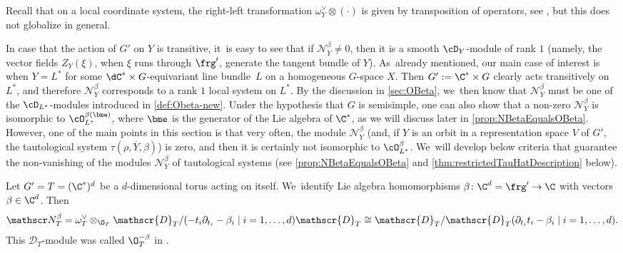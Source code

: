 Recall that on a local coordinate system, the right-left transformation $\omega_Y^\vee \otimes (\cdot)$ is given by transposition of operators, see \eg \cite[\S 1.2]{Hotta}, but this does not globalize in general.

\begin{rmk}\label{rem:LocSysRkOne}
In case that the action of $G'$ on $Y$ is transitive, it~is easy to see that if $\mathscr N_Y^\beta\neq 0$, then it is a smooth $\cD_Y$\nobreakdash-mod\-ule of rank $1$ (namely, the vector fields $Z_Y(\xi)$, when $\xi$ runs through $\frg'$, generate the tangent bundle of $Y$). As~already mentioned, our main case of interest is when $Y=L^*$ for some $\dC^*\times G$-equivariant line bundle~$L$ on a homogeneous $G$-space $X$. Then $G':=\C^*\times G$ clearly acts transitively on $L^*$, and therefore $\mathscr N_Y^\beta$ corresponds to a rank $1$ local system on $L^*$. By the discussion in \cref{sec:OBeta}, we~then know that $\mathscr N_Y^\beta$ must be one of the $\cD_{L^*}$\nobreakdash-mod\-ules introduced in \cref{def:Obeta-new}. Under the hypothesis that $G$ is semisimple, one can also show that a non-zero $\mathscr{N}_Y^\beta$ is isomorphic to
$\cO_{L^*}^{\beta(\bme)}$, where $\bme$ is the generator of the Lie algebra of $\C^*$, as we will discuss later in \cref{prop:NBetaEqualsOBeta}. However, one of the main points in this section is that very often, the module $\mathscr N_Y^\beta$ (and, if $Y$ is an orbit in a representation space $V$ of $G'$, the tautological system $\tau(\rho,\overline{Y},\beta)$) is zero, and then it is certainly not isomorphic to $\cO_{L^*}^{\beta}$. We~will develop below criteria that guarantee the non-vanishing of the modules $\mathscr N_Y^\beta$ \resp of tautological systems (see \cref{prop:NBetaEqualsOBeta} and \cref{thm:restrictedTauHatDescription} below).
\end{rmk}

\begin{exa}
Let $G' = T = (\C^*)^d$ be a $d$-dimensional torus acting on itself. We~identify Lie algebra homomorphisms $\beta \colon \C^d = \frg' \to \C$ with vectors $\beta \in \C^d$. Then
\[
\mathscr N_T^\beta = \omega_T^\vee \otimes_{\O_T} \mathscr{D}_T/(-t_i \partial_{t_i}-\beta_i \mid i = 1,\dots,d)\mathscr{D}_T \cong \mathscr{D}_T/\mathscr{D}_T(\partial_{t_i} t_i-\beta_i \mid i = 1,\dots,d).
\]
This $\mathscr D_T$\nobreakdash-mod\-ule was called $\O_T^{-\beta}$ in \cite{RS20}. \end{exa}

